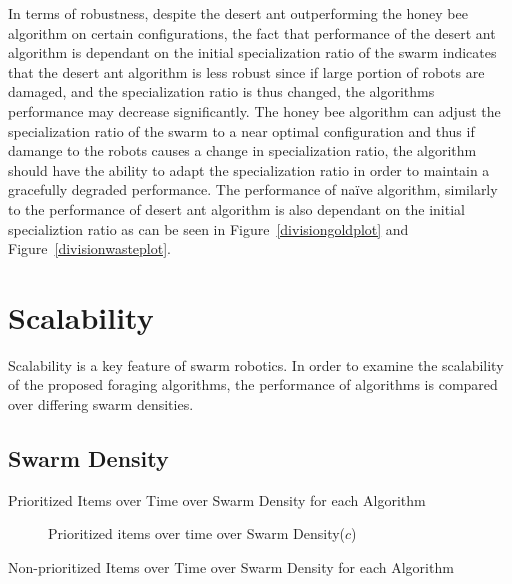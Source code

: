 In terms of robustness, despite the desert ant outperforming the honey bee algorithm on certain configurations, the fact that performance of the desert ant algorithm is dependant on the initial specialization ratio of the swarm indicates that the desert ant algorithm is less robust since if large portion of robots are damaged, and the specialization ratio is thus changed, the algorithms performance may decrease significantly. The honey bee algorithm can adjust the specialization ratio of the swarm to a near optimal configuration and thus if damange to the robots causes a change in specialization ratio, the algorithm should have the ability to adapt the specialization ratio in order to maintain a gracefully degraded performance. The performance of na\"ive algorithm, similarly to the performance of desert ant algorithm is also dependant on the initial specializtion ratio as can be seen in Figure~\ref{divisiongoldplot} and Figure~\ref{divisionwasteplot}. 

\section{Scalability}
\label{results:scability}
Scalability is a key feature of swarm robotics. In order to examine the scalability of the proposed foraging algorithms, the performance of algorithms is compared over differing swarm densities. 

\subsection{Swarm Density}
\label{results:numberenvironments}

\begin{table} [h]
     \caption{Prioritized Items over Time over Swarm Density for each Algorithm}
     \label{specializationprioritized}
	\centering
	\footnotesize
	
\end{table}
\begin{figure}[!htb]
\centering
\resizebox{\textwidth}{!}{}
\caption{Prioritized items over time over Swarm Density($c$)}
\label{robotsgoldplot}
\end{figure}

\begin{table} [h]
     \caption{Non-prioritized Items over Time over Swarm Density for each Algorithm}
     \label{specializationnonprioritized}
	\centering
	\footnotesize
	
\end{table}




